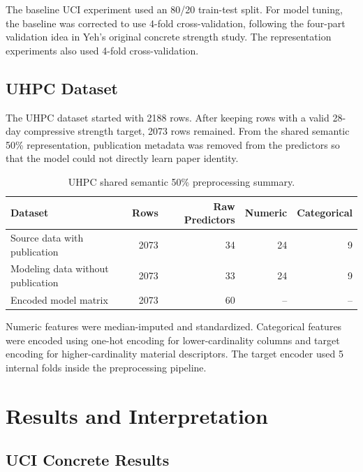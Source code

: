 \documentclass[10pt]{article}
\begin{document}
The baseline UCI experiment used an 80/20 train-test split. For model tuning, the baseline was corrected to use 4-fold cross-validation, following the four-part validation idea in Yeh's original concrete strength study. The representation experiments also used 4-fold cross-validation.

\subsection{UHPC Dataset}
The UHPC dataset started with 2188 rows. After keeping rows with a valid 28-day compressive strength target, 2073 rows remained. From the shared semantic 50\% representation, publication metadata was removed from the predictors so that the model could not directly learn paper identity.

\begin{table}[h!]
\centering
\small
\caption{UHPC shared semantic 50\% preprocessing summary.}
\label{tab:uhpc-preprocessing}
\begin{tabular}{lrrrr}
\toprule
\textbf{Dataset} & \textbf{Rows} & \textbf{Raw Predictors} & \textbf{Numeric} & \textbf{Categorical} \\
\midrule
Source data with publication & 2073 & 34 & 24 & 9 \\
Modeling data without publication & 2073 & 33 & 24 & 9 \\
Encoded model matrix & 2073 & 60 & -- & -- \\
\bottomrule
\end{tabular}
\end{table}

Numeric features were median-imputed and standardized. Categorical features were encoded using one-hot encoding for lower-cardinality columns and target encoding for higher-cardinality material descriptors. The target encoder used 5 internal folds inside the preprocessing pipeline.

\section{Results and Interpretation}

\subsection{UCI Concrete Results}
\end{document}
